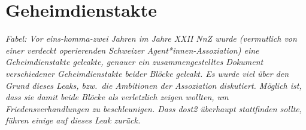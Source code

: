 \section{Geheimdienstakte}\label{sec:geheimdienstakte}

\emph{Fabel: Vor eins-komma-zwei Jahren im Jahre XXII NnZ wurde (vermutlich von
einer verdeckt operierenden Schweizer Agent*innen-Assoziation) eine
Geheimdienstakte geleakte, genauer ein zusammengestelltes Dokument verschiedener
Geheimdienstakte beider Blöcke geleakt. Es wurde viel über den Grund dieses
Leaks, bzw.~die Ambitionen der Assoziation diskutiert. Möglich ist, dass sie
damit beide Blöcke als verletzlich zeigen wollten, um Friedensverhandlungen zu
beschleunigen. Dass \ac{dost2} überhaupt stattfinden sollte, führen einige auf
dieses Leak zurück.}
